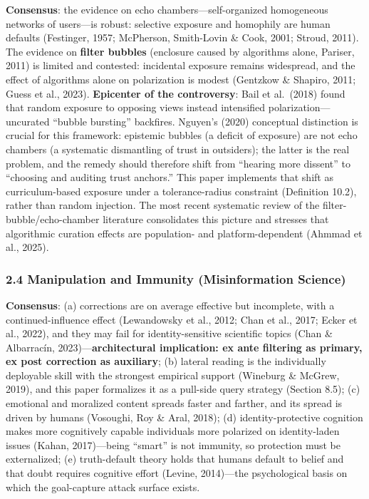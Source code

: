 \documentclass[
  11pt]{article}
\begin{document}
\textbf{Consensus}: the evidence on echo chambers---self-organized
homogeneous networks of users---is robust: selective exposure and
homophily are human defaults (Festinger, 1957; McPherson, Smith-Lovin \&
Cook, 2001; Stroud, 2011). The evidence on \textbf{filter bubbles}
(enclosure caused by algorithms alone, Pariser, 2011) is limited and
contested: incidental exposure remains widespread, and the effect of
algorithms alone on polarization is modest (Gentzkow \& Shapiro, 2011;
Guess et al., 2023). \textbf{Epicenter of the controversy}: Bail et
al.~(2018) found that random exposure to opposing views instead
intensified polarization---uncurated ``bubble bursting'' backfires.
Nguyen's (2020) conceptual distinction is crucial for this framework:
epistemic bubbles (a deficit of exposure) are not echo chambers (a
systematic dismantling of trust in outsiders); the latter is the real
problem, and the remedy should therefore shift from ``hearing more
dissent'' to ``choosing and auditing trust anchors.'' This paper
implements that shift as curriculum-based exposure under a
tolerance-radius constraint (Definition 10.2), rather than random
injection. The most recent systematic review of the
filter-bubble/echo-chamber literature consolidates this picture and
stresses that algorithmic curation effects are population- and
platform-dependent (Ahmmad et al., 2025).

\subsubsection{2.4 Manipulation and Immunity (Misinformation
Science)}\label{manipulation-and-immunity-misinformation-science}

\textbf{Consensus}: (a) corrections are on average effective but
incomplete, with a continued-influence effect (Lewandowsky et al., 2012;
Chan et al., 2017; Ecker et al., 2022), and they may fail for
identity-sensitive scientific topics (Chan \& Albarracín,
2023)---\textbf{architectural implication: ex ante filtering as primary,
ex post correction as auxiliary}; (b) lateral reading is the
individually deployable skill with the strongest empirical support
(Wineburg \& McGrew, 2019), and this paper formalizes it as a pull-side
query strategy (Section 8.5); (c) emotional and moralized content
spreads faster and farther, and its spread is driven by humans
(Vosoughi, Roy \& Aral, 2018); (d) identity-protective cognition makes
more cognitively capable individuals more polarized on identity-laden
issues (Kahan, 2017)---being ``smart'' is not immunity, so protection
must be externalized; (e) truth-default theory holds that humans default
to belief and that doubt requires cognitive effort (Levine, 2014)---the
psychological basis on which the goal-capture attack surface exists.
\end{document}
